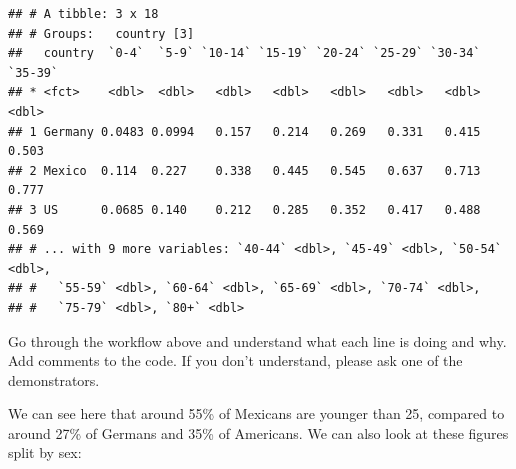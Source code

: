 \documentclass[]{book}
\newenvironment{Shaded}{\begin{snugshade}}{\end{snugshade}}
\newcommand{\KeywordTok}[1]{\textcolor[rgb]{0.13,0.29,0.53}{\textbf{{#1}}}}
\newcommand{\DataTypeTok}[1]{\textcolor[rgb]{0.13,0.29,0.53}{{#1}}}
\newcommand{\StringTok}[1]{\textcolor[rgb]{0.31,0.60,0.02}{{#1}}}
\newcommand{\NormalTok}[1]{{#1}}
\newcommand{\bblockT}[1]{\begin{tcolorbox}[title = Task #1]}
\newcommand{\eblockT}{\end{tcolorbox}}
\theoremstyle{definition}
\theoremstyle{definition}
\theoremstyle{definition}
\theoremstyle{remark}
\begin{document}
\begin{Shaded}
\end{Shaded}

\begin{verbatim}
## # A tibble: 3 x 18
## # Groups:   country [3]
##   country  `0-4`  `5-9` `10-14` `15-19` `20-24` `25-29` `30-34` `35-39`
## * <fct>    <dbl>  <dbl>   <dbl>   <dbl>   <dbl>   <dbl>   <dbl>   <dbl>
## 1 Germany 0.0483 0.0994   0.157   0.214   0.269   0.331   0.415   0.503
## 2 Mexico  0.114  0.227    0.338   0.445   0.545   0.637   0.713   0.777
## 3 US      0.0685 0.140    0.212   0.285   0.352   0.417   0.488   0.569
## # ... with 9 more variables: `40-44` <dbl>, `45-49` <dbl>, `50-54` <dbl>,
## #   `55-59` <dbl>, `60-64` <dbl>, `65-69` <dbl>, `70-74` <dbl>,
## #   `75-79` <dbl>, `80+` <dbl>
\end{verbatim}

\hypertarget{tsk17}{}\bblockT{17}

Go through the workflow above and understand what each line is doing and
why. Add comments to the code. If you don't understand, please ask one
of the demonstrators. \eblockT

We can see here that around 55\% of Mexicans are younger than 25,
compared to around 27\% of Germans and 35\% of Americans. We can also
look at these figures split by sex:

\begin{Shaded}
\end{Shaded}
\end{document}
